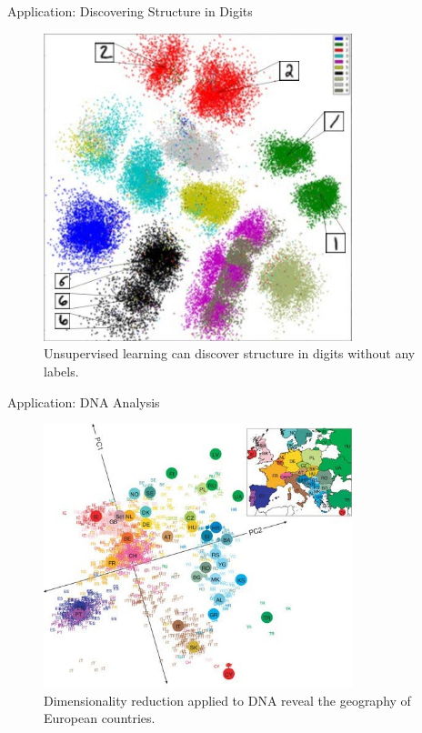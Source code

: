 \begin{frame}{Application: Discovering Structure in Digits}
    \begin{figure}
    \centering
    \includegraphics[width=0.8\textwidth,height=0.75\textheight,keepaspectratio]{images/dul/discover-structure.jpg}
    \caption{Unsupervised learning can discover structure in digits without any labels.}
    \end{figure}
\end{frame}

\begin{frame}{Application: DNA Analysis}
    \begin{figure}
    \centering
    \includegraphics[width=0.8\textwidth,height=0.75\textheight,keepaspectratio]{images/dul/dim-reduce.jpg}
    \caption{Dimensionality reduction applied to DNA reveal the geography of European countries.}
    \end{figure}
\end{frame}

